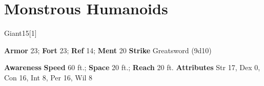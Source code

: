 \section{Monstrous Humanoids}
\begin{monsection}[Storm]{Giant}{15}[1]
\vspace{-1em}\vspace{-1em}
\begin{spellcontent}
\begin{spelltargetinginfo}
\pari \textbf{Armor} 23; \textbf{Fort} 23; \textbf{Ref} 14; \textbf{Ment} 20
\pari \textbf{Strike} Greatsword  (9d10)
\end{spelltargetinginfo}
\end{spellcontent}
\begin{spellsubcontent}
\begin{spellfooter}
\pari \textbf{Awareness} 
\pari \textbf{Speed} 60 ft.; \textbf{Space} 20 ft.; \textbf{Reach} 20 ft.
\pari \textbf{Attributes} Str 17, Dex 0, Con 16, Int 8, Per 16, Wil 8
\end{spellfooter}
\end{spellsubcontent}
\end{monsection}
